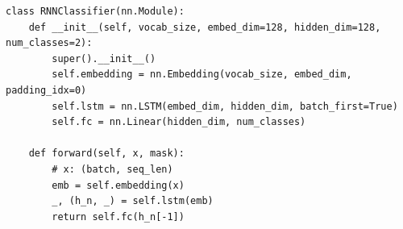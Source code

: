 \begin{listing}
    \begin{verbatim}
class RNNClassifier(nn.Module):
    def __init__(self, vocab_size, embed_dim=128, hidden_dim=128, num_classes=2):
        super().__init__()
        self.embedding = nn.Embedding(vocab_size, embed_dim, padding_idx=0)
        self.lstm = nn.LSTM(embed_dim, hidden_dim, batch_first=True)
        self.fc = nn.Linear(hidden_dim, num_classes)

    def forward(self, x, mask):
        # x: (batch, seq_len)
        emb = self.embedding(x)
        _, (h_n, _) = self.lstm(emb)
        return self.fc(h_n[-1])
    \end{verbatim}
    \caption{RNN/LSTM-Based Text Classifier}
    \label{lst:rnn_classifier}
\end{listing}
